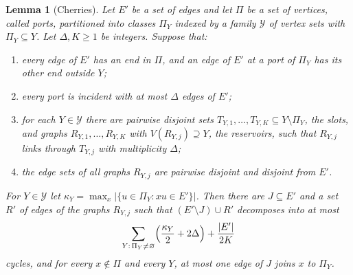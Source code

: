 \documentclass[11pt]{article}
\newtheorem{lemma}[theorem]{Lemma}
\theoremstyle{definition}
\theoremstyle{remark}
\numberwithin{equation}{section}
\numberwithin{figure}{section}
\numberwithin{table}{section}
\newcommand{\cY}{\mathcal{Y}}
\begin{document}
\begin{lemma}[Cherries]\label{lem:cherry}
Let $E'$ be a set of edges and let $\Pi$ be a set of vertices, called
\emph{ports}, partitioned into classes $\Pi_Y$ indexed by a family $\cY$ of
vertex sets with $\Pi_Y\subseteq Y$. Let $\Delta,K\ge1$ be integers. Suppose
that:
\begin{enumerate}[label=\textup{(C\arabic*)},leftmargin=3em,itemsep=1pt]
\item\label{it:C1} every edge of $E'$ has an end in $\Pi$, and an edge of $E'$
at a port of $\Pi_Y$ has its other end outside $Y$;
\item\label{it:C2} every port is incident with at most $\Delta$ edges of $E'$;
\item\label{it:C3} for each $Y\in\cY$ there are pairwise disjoint sets
$T_{Y,1},\dots,T_{Y,K}\subseteq Y\setminus\Pi_Y$, the \emph{slots}, and graphs
$R_{Y,1},\dots,R_{Y,K}$ with $V(R_{Y,j})\supseteq Y$, the \emph{reservoirs},
such that $R_{Y,j}$ links through $T_{Y,j}$ with multiplicity $\Delta$;
\item\label{it:C4} the edge sets of all graphs $R_{Y,j}$ are pairwise disjoint
and disjoint from $E'$.
\end{enumerate}
For $Y\in\cY$ let $\kappa_Y=\max_x|\{u\in\Pi_Y:xu\in E'\}|$. Then there are
$J\subseteq E'$ and a set $R'$ of edges of the graphs $R_{Y,j}$ such that
$(E'\setminus J)\cup R'$ decomposes into at most
\[
\sum_{Y:\,\Pi_Y\neq\varnothing}\Bigl(\frac{\kappa_Y}2+2\Delta\Bigr)+\frac{|E'|}{2K}
\]
cycles, and for every $x\notin\Pi$ and every $Y$, at most one edge of $J$
joins $x$ to $\Pi_Y$.
\end{lemma}
\end{document}

